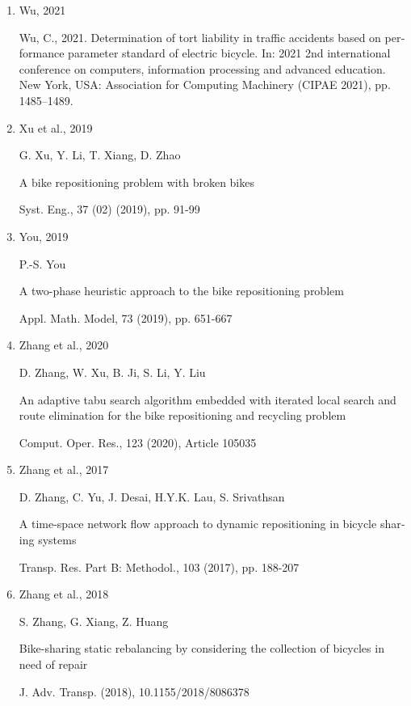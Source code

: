 \documentclass[
  english,
]{article}
\begin{document}
\begin{otherlanguage}{english}
\begin{enumerate}
  Y. Wang, W.Y. Szeto

  An enhanced artificial bee colony algorithm for the green bike repositioning problem with broken
  bikes

  Transp. Res. Part C: Emerg. Technol., 125 (2021), Article 102895
\item
  Wu, 2021

  Wu, C., 2021. Determination of tort liability in traffic accidents based on performance parameter
  standard of electric bicycle. In: 2021 2nd international conference on computers, information
  processing and advanced education. New York, USA: Association for Computing Machinery (CIPAE
  2021), pp. 1485--1489.
\item
  Xu et al., 2019

  G. Xu, Y. Li, T. Xiang, D. Zhao

  A bike repositioning problem with broken bikes

  Syst. Eng., 37 (02) (2019), pp. 91-99
\item
  You, 2019

  P.-S. You

  A two-phase heuristic approach to the bike repositioning problem

  Appl. Math. Model, 73 (2019), pp. 651-667
\item
  Zhang et al., 2020

  D. Zhang, W. Xu, B. Ji, S. Li, Y. Liu

  An adaptive tabu search algorithm embedded with iterated local search and route elimination for
  the bike repositioning and recycling problem

  Comput. Oper. Res., 123 (2020), Article 105035
\item
  Zhang et al., 2017

  D. Zhang, C. Yu, J. Desai, H.Y.K. Lau, S. Srivathsan

  A time-space network flow approach to dynamic repositioning in bicycle sharing systems

  Transp. Res. Part B: Methodol., 103 (2017), pp. 188-207
\item
  Zhang et al., 2018

  S. Zhang, G. Xiang, Z. Huang

  Bike-sharing static rebalancing by considering the collection of bicycles in need of repair

  J. Adv. Transp. (2018), 10.1155/2018/8086378
\end{enumerate}


\end{otherlanguage}
\end{document}
